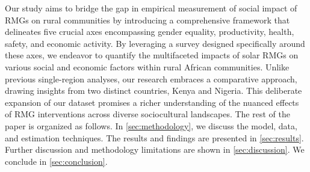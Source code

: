 Our study aims to bridge the gap in empirical measurement of social impact of RMGs on rural communities by introducing a comprehensive framework that delineates five crucial axes encompassing gender equality, productivity, health, safety, and economic activity. By leveraging a survey designed specifically around these axes, we endeavor to quantify the multifaceted impacts of solar RMGs on various social and economic factors within rural African communities. Unlike previous single-region analyses, our research embraces a comparative approach, drawing insights from two distinct countries, Kenya and Nigeria. This deliberate expansion of our dataset promises a richer understanding of the nuanced effects of RMG interventions across diverse sociocultural landscapes. The rest of the paper is organized as follows. In \cref{sec:methodology}, we discuss the model, data, and estimation techniques. The results and findings are presented in \cref{sec:results}. Further discussion and methodology limitations are shown in \cref{sec:discussion}. We conclude in \cref{sec:conclusion}.
